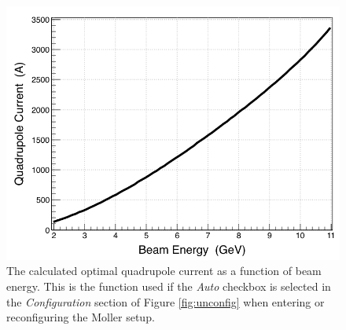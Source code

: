 \documentclass[amsmath,amssymb,notitlepage,12pt]{revtex4}
\begin{document}
\begin{figure}[htbp]\centering
    \includegraphics[width=14cm]{pics/moller_quad_current}
    \caption{The calculated optimal quadrupole current as a function of beam energy.  This is the function used if the {\em Auto} checkbox is selected in the {\em Configuration} section of Figure \ref{fig:unconfig} when entering or reconfiguring the Moller setup.\label{fig:quadenergy}}
\end{figure}

\end{document}
